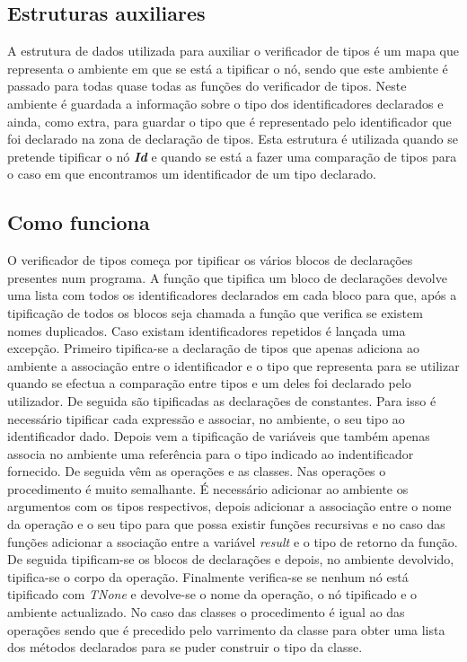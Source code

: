 \subsection{Estruturas auxiliares}

A estrutura de dados utilizada para auxiliar o verificador de tipos é um mapa 
que representa o ambiente em que se está a tipificar o nó, sendo que este 
ambiente é passado para todas quase todas as funções do verificador de tipos. 
Neste ambiente é guardada a informação sobre o tipo dos identificadores 
declarados e ainda, como extra, para guardar o tipo que é representado pelo 
identificador que foi declarado na zona de declaração de tipos. Esta estrutura 
é utilizada quando se pretende tipificar o nó \emph{\textbf{Id}} e quando se 
está a fazer uma comparação de tipos para o caso em que encontramos um 
identificador de um tipo declarado.

\subsection{Como funciona}

O verificador de tipos começa por tipificar os vários blocos de declarações 
presentes num programa. A função que tipifica um bloco de declarações devolve 
uma lista com todos os identificadores declarados em cada bloco para que, após 
a tipificação de todos os blocos seja chamada a função que verifica se existem 
nomes duplicados. Caso existam identificadores repetidos é lançada uma 
excepção. Primeiro tipifica-se a declaração de tipos que apenas adiciona ao 
ambiente a associação entre o identificador e o tipo que representa para se 
utilizar quando se efectua a comparação entre tipos e um deles foi declarado 
pelo utilizador. De seguida são tipificadas as declarações de constantes. Para 
isso é necessário tipificar cada expressão e associar, no ambiente, o seu tipo 
ao identificador dado. Depois vem a tipificação de variáveis que também apenas 
associa no ambiente uma referência para o tipo indicado ao indentificador 
fornecido. De seguida vêm as operações e as classes. Nas operações o 
procedimento é muito semalhante. É necessário adicionar ao ambiente os 
argumentos com os tipos respectivos, depois adicionar a associação entre o nome 
da operação e o seu tipo para que possa existir funções recursivas e no caso 
das funções adicionar a ssociação entre a variável \emph{result} e o tipo de 
retorno da função. De seguida tipificam-se os blocos de declarações e depois, 
no ambiente devolvido, tipifica-se o corpo da operação. Finalmente verifica-se 
se nenhum nó está tipificado com \emph{TNone} e devolve-se o nome da operação, 
o nó tipificado e o ambiente actualizado. No caso das classes o procedimento é 
igual ao das operações sendo que é precedido pelo varrimento da classe para 
obter uma lista dos métodos declarados para se puder construir o tipo da classe.

